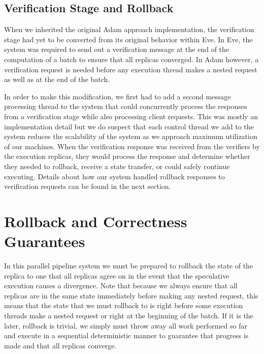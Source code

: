\documentclass[11pt, oneside]{report}
\begin{document}
\subsection{Verification Stage and Rollback}

When we inherited the original Adam approach implementation, the verification stage had yet to be converted from its original behavior within Eve. 
In Eve, the system was required to send out a verification message at the end of the computation of a batch to ensure that all replicas converged. 
In Adam however, a verification request is needed before any execution thread makes a nested request as well as at the end of the batch.

In order to make this modification, we first had to add a second message processing thread to the system that could concurrently process the responses from a verification stage while also processing client requests. 
This was mostly an implementation detail but we do suspect that each control thread we add to the system reduces the scalability of the system as we approach maximum utilization of our machines. 
When the verification response was received from the verifiers by the execution replicas, they would process the response and determine whether they needed to rollback, receive a state transfer, or could safely continue executing. 
Details about how our system handled rollback responses to verification requests can be found in the next section.

\section{Rollback and Correctness Guarantees}

In this parallel pipeline system we must be prepared to rollback the state of the replica to one that all replicas agree on in the event that the speculative execution causes a divergence. 
Note that because we always ensure that all replicas are in the same state immediately before making any nested request, this means that the state that we must rollback to is right before some execution threads make a nested request or right at the beginning of the batch. 
If it is the later, rollback is trivial, we simply must throw away all work performed so far and execute in a sequential deterministic manner to guarantee that progress is made and that all replicas converge.
\end{document}
